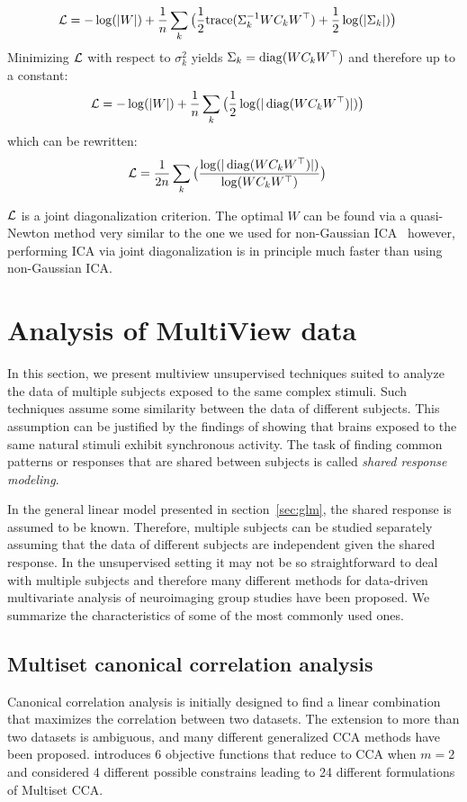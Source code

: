 \begin{align}  
  \mathcal{L} &= -\log(|W|)  + \frac1{n} \sum_k \big( \frac1{2} {\mathrm{ trace}}(\Sigma_k^{-1} W C_k W^{\top}) + \frac12 \log(|\Sigma_k|) \big)
\end{align}
Minimizing $\mathcal{L}$ with respect to $\sigma_k^2$ yields $\Sigma_k = \operatorname*{diag}(W C_k
W^{\top})$ and therefore up to a constant:
\begin{align}  
  \mathcal{L} &= -\log(|W|)  + \frac1{n} \sum_k \big(\frac12 \log(|\operatorname*{diag}(W C_k W^{\top})|) \big)
\end{align}
which can be rewritten:
\begin{align}  
  \mathcal{L} &=\frac1{2n} \sum_k \big(\frac{\log(|\operatorname*{diag}(W C_k W^{\top})|)}{\log(W C_k W^{\top})} \big)
\end{align}

$\mathcal{L}$ is a joint diagonalization criterion. The optimal $W$ can be found via a
quasi-Newton method very similar to the one we used for non-Gaussian
ICA~\cite{ablin2018beyond} however, performing ICA via joint diagonalization is
in principle much faster than using non-Gaussian ICA.

\section{Analysis of MultiView data}
In this section, we present multiview unsupervised techniques suited to
analyze the data of multiple subjects exposed to the same complex stimuli. Such
techniques assume some similarity between the data of different subjects. This
assumption can be justified by the findings of \cite{hasson2004intersubject} showing that brains exposed to the same natural stimuli exhibit synchronous activity.
The task of finding common patterns or responses that are shared between
subjects is called \emph{shared response modeling}.

In the general linear model presented in
section~\ref{sec:glm}, the shared response is assumed to be known. Therefore,
multiple subjects can be studied separately assuming that the data of different
subjects are independent given the shared response.
In the unsupervised setting it may not be so straightforward to deal with
multiple subjects and therefore many different
methods for data-driven multivariate analysis of neuroimaging group studies
have been proposed.
We summarize the characteristics of some of the most commonly used ones.


\subsection{Multiset canonical correlation analysis}
\label{sec:mcca}
Canonical correlation analysis is initially designed to find a linear
combination that maximizes the correlation between two datasets.
The extension to more than two datasets is ambiguous, and many
different generalized CCA methods have been proposed. \cite{kettenring1971canonical} introduces 6 objective functions that reduce to CCA when $m=2$ and \cite{nielsen2002multiset} considered 4 different possible constrains leading to 24 different formulations of Multiset CCA.


